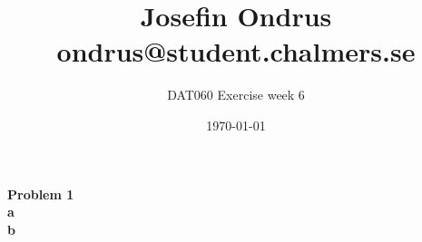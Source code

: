 \documentclass[12pt,oneside,reqno]{amsart}
\begin{document}
\setlength{\parindent}{6pt}
\def\code#1{\texttt{#1}} %
\def\ra{\rightarrow{}} %
\newcommand{\itab}[1]{\hspace{0em}\rlap{#1}}
\newcommand{\tab}[1]{\hspace{.2\textwidth}\rlap{#1}}
\newcommand\deff{\mathrel{\stackrel{\makebox[0pt]{\mbox{\normalfont\tiny def}}}{=}}}
\raggedbottom

\title{Josefin Ondrus\\ondrus@student.chalmers.se}
\author{DAT060 Exercise week 6}
\date{\today}
\maketitle

\textbf{Problem 1}\\
\textbf{a}\\

\textbf{b}\\
\end{document}
